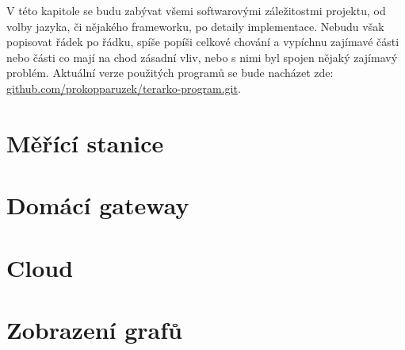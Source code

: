 V této kapitole se budu zabývat všemi softwarovými záležitostmi projektu, od volby jazyka, či nějakého frameworku, po 
detaily implementace. Nebudu však popisovat řádek po řádku, spíše popíši celkové chování a vypíchnu zajímavé části nebo 
části co mají na chod zásadní vliv, nebo s nimi byl spojen nějaký zajímavý problém. Aktuální verze použitých programů se 
bude nacházet zde: 
\href{https://github.com/prokopparuzek/terarko-program.git}{github.com/prokopparuzek/terarko-program.git}.
\section{Měřící stanice}

\section{Domácí gateway}
\section{Cloud}
\section{Zobrazení grafů}
